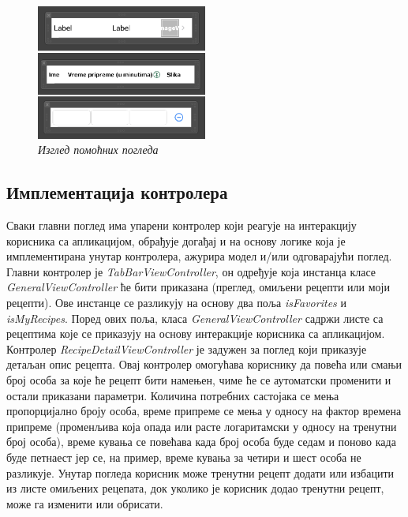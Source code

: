 \documentclass[12pt,oneside]{memoir}
\begin{document}
\begin{figure} [H]
    \centering
    \captionsetup{justification=centering}
    \includegraphics[width=0.5\textwidth]{images/helper_views.png} 
    \caption{\textit{Изглед помоћних погледа}}
    \label{slika:помоћни_погледи}
\end{figure}

\subsection{Имплементација контролера}

Сваки главни поглед има упарени контролер који реагује на интеракцију корисника са апликацијом, обрађује догађај и на основу логике која је имплементирана унутар контролера, ажурира модел и/или одговарајући поглед. Главни контролер је \textit{TabBarViewController}, он одређује која инстанца класе \textit{GeneralViewController} ће бити приказана (преглед, омиљени рецепти или моји рецепти). Ове инстанце се разликују на основу два поља \textit{isFavorites} и \textit{isMyRecipes}. Поред ових поља, класа \textit{GeneralViewController} садржи листе са рецептима које се приказују на основу интеракције корисника са апликацијом. 
Контролер \textit{RecipeDetailViewController} је задужен за поглед који приказује детаљан опис рецепта. Овај контролер омогућава кориснику да повећа или смањи број особа за које ће рецепт бити намењен, чиме ће се аутоматски променити и остали приказани параметри. Количина потребних састојака се мења пропорцијално броју особа, време припреме се мења у односу на фактор времена припреме (променљива која опада или расте логаритамски у односу на тренутни број особа), време кувања се повећава када број особа буде седам и поново када буде петнаест јер се, на пример, време кувања за четири и шест особа не разликује. Унутар погледа корисник може тренутни рецепт додати или избацити из листе омиљених рецепата, док уколико је корисник додао тренутни рецепт, може га изменити или обрисати.
\end{document}

